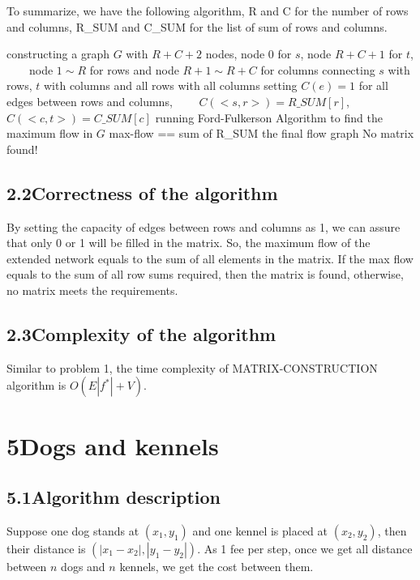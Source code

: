 \documentclass[a4paper,12pt]{article}
\begin{document}
To summarize, we have the following algorithm, R and C for the number of rows and columns, R\_SUM and C\_SUM for the list of sum of rows and columns.

\begin{codebox}
\li constructing a graph $G$ with $R+C+2$ nodes, node 0 for $s$, node $R+C+1$ for $t$,
\zi ~~~~node $1\sim R$ for rows and node $R+1\sim R+C$ for columns
\li connecting $s$ with rows, $t$ with columns and all rows with all columns
\li setting $C(e) = 1$ for all edges between rows and columns,
\zi ~~~~$C(<s,r>) = R\_SUM[r]$, $C(<c,t>) = C\_SUM[c]$
\li running Ford-Fulkerson Algorithm to find the maximum flow in $G$
\li \If max-flow == sum of R\_SUM
    \Then
\li \Return the final flow graph
\li \Else
    \Return No matrix found!
    \End
\end{codebox}

\subsection*{\textnormal{2.2\quad Correctness of the algorithm}}

By setting the capacity of edges between rows and columns as 1, we can assure that only 0 or 1 will be filled in the matrix. So, the maximum flow of the extended network equals to the sum of all elements in the matrix. If the max flow equals to the sum of all row sums required, then the matrix is found, otherwise, no matrix meets the requirements.

\subsection*{\textnormal{2.3\quad Complexity of the algorithm}}

Similar to problem 1, the time complexity of MATRIX-CONSTRUCTION algorithm is $O(E|f^*|+V)$.

\section*{5\quad Dogs and kennels}
\subsection*{\textnormal{5.1\quad Algorithm description}}

Suppose one dog stands at $(x_1,y_1)$ and one kennel is placed at $(x_2,y_2)$, then their distance is $(|x_1-x_2|,|y_1-y_2|)$. As 1 fee per step, once we get all distance between $n$ dogs and $n$ kennels, we get the cost between them.
\end{document}
